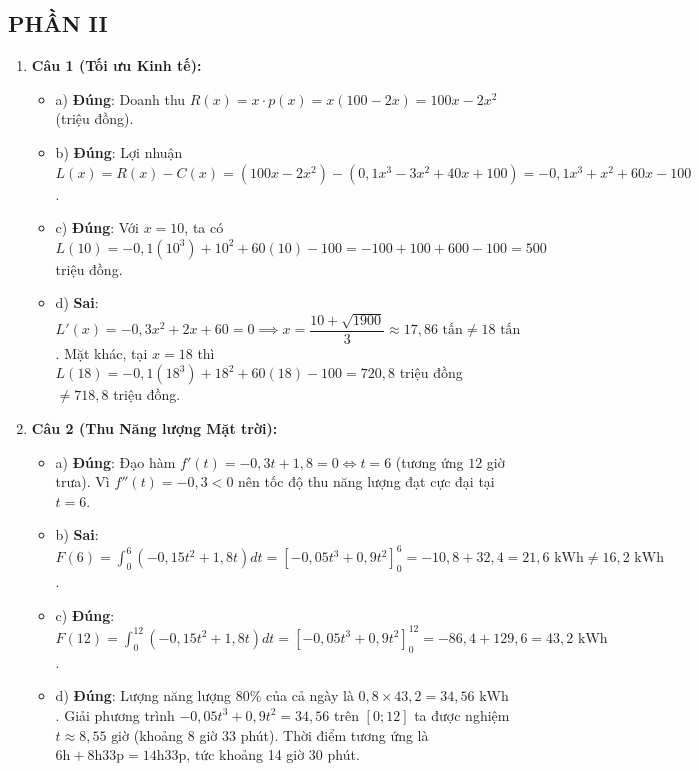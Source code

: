 \documentclass[12pt,a4paper]{article}
\begin{document}
\subsection*{PHẦN II}
\begin{enumerate}[label=\textbf{Câu \arabic*:}, leftmargin=*]
\item \textbf{Câu 1 (Tối ưu Kinh tế):}
\begin{itemize}
    \item a) \textbf{Đúng}: Doanh thu $R(x) = x \cdot p(x) = x(100 - 2x) = 100x - 2x^2$ (triệu đồng).
    \item b) \textbf{Đúng}: Lợi nhuận $L(x) = R(x) - C(x) = (100x - 2x^2) - (0{,}1x^3 - 3x^2 + 40x + 100) = -0{,}1x^3 + x^2 + 60x - 100$.
    \item c) \textbf{Đúng}: Với $x = 10$, ta có $L(10) = -0{,}1(10^3) + 10^2 + 60(10) - 100 = -100 + 100 + 600 - 100 = 500$ triệu đồng.
    \item d) \textbf{Sai}: $L'(x) = -0{,}3x^2 + 2x + 60 = 0 \implies x = \dfrac{10 + \sqrt{1900}}{3} \approx 17{,}86\text{ tấn} \neq 18\text{ tấn}$. Mặt khác, tại $x = 18$ thì $L(18) = -0{,}1(18^3) + 18^2 + 60(18) - 100 = 720{,}8$ triệu đồng $\neq 718{,}8$ triệu đồng.
\end{itemize}

\item \textbf{Câu 2 (Thu Năng lượng Mặt trời):}
\begin{itemize}
    \item a) \textbf{Đúng}: Đạo hàm $f'(t) = -0{,}3t + 1{,}8 = 0 \iff t = 6$ (tương ứng $12$ giờ trưa). Vì $f''(t) = -0{,}3 < 0$ nên tốc độ thu năng lượng đạt cực đại tại $t = 6$.
    \item b) \textbf{Sai}: $F(6) = \int_0^6 (-0{,}15t^2 + 1{,}8t) dt = \left[-0{,}05t^3 + 0{,}9t^2\right]_0^6 = -10{,}8 + 32{,}4 = 21{,}6\text{ kWh} \neq 16{,}2\text{ kWh}$.
    \item c) \textbf{Đúng}: $F(12) = \int_0^{12} (-0{,}15t^2 + 1{,}8t) dt = \left[-0{,}05t^3 + 0{,}9t^2\right]_0^{12} = -86{,}4 + 129{,}6 = 43{,}2\text{ kWh}$.
    \item d) \textbf{Đúng}: Lượng năng lượng $80\%$ của cả ngày là $0{,}8 \times 43{,}2 = 34{,}56\text{ kWh}$. Giải phương trình $-0{,}05t^3 + 0{,}9t^2 = 34{,}56$ trên $[0; 12]$ ta được nghiệm $t \approx 8{,}55\text{ giờ}$ (khoảng 8 giờ 33 phút). Thời điểm tương ứng là $6\text{h} + 8\text{h}33\text{p} = 14\text{h}33\text{p}$, tức khoảng 14 giờ 30 phút.
\end{itemize}


\end{enumerate}
\end{document}
